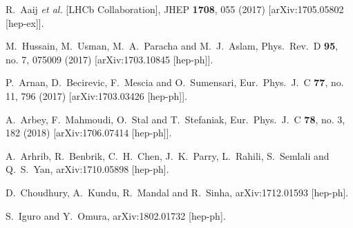 \documentclass[prd,preprint,superscriptaddress,amsmath,amssymb]{revtex4}
\begin{document}
\begin{thebibliography}{100}
  
  
  R.~Aaij {\it et al.} [LHCb Collaboration],
  JHEP {\bf 1708}, 055 (2017)
  [arXiv:1705.05802 [hep-ex]].


  M.~Hussain, M.~Usman, M.~A.~Paracha and M.~J.~Aslam,
  Phys.\ Rev.\ D {\bf 95}, no. 7, 075009 (2017)
  [arXiv:1703.10845 [hep-ph]].

  P.~Arnan, D.~Becirevic, F.~Mescia and O.~Sumensari,
  Eur.\ Phys.\ J.\ C {\bf 77}, no. 11, 796 (2017)
  [arXiv:1703.03426 [hep-ph]].
  
  A.~Arbey, F.~Mahmoudi, O.~Stal and T.~Stefaniak,
  Eur.\ Phys.\ J.\ C {\bf 78}, no. 3, 182 (2018)
  [arXiv:1706.07414 [hep-ph]].


  A.~Arhrib, R.~Benbrik, C.~H.~Chen, J.~K.~Parry, L.~Rahili, S.~Semlali and Q.~S.~Yan,
  arXiv:1710.05898 [hep-ph].
  
  D.~Choudhury, A.~Kundu, R.~Mandal and R.~Sinha,
  arXiv:1712.01593 [hep-ph].
  
  S.~Iguro and Y.~Omura,
  arXiv:1802.01732 [hep-ph].
  


\end{thebibliography}
\end{document}
